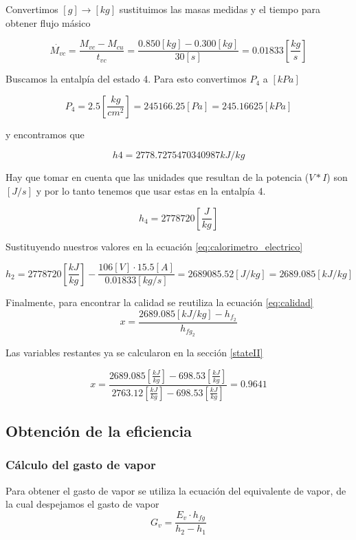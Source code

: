 \documentclass[12pt,letterpaper]{article}
\begin{document}
Convertimos $[g]\to[kg]$ sustituimos las masas medidas y el tiempo para obtener flujo másico

$$
    \dot{M_{vc}}=\frac{M_{vc}-M_{cu}}{t_{vc}}=\frac{0.850[kg]-0.300[kg]}{30[s]}=0.01833 \left[\frac{kg}{s}\right]
$$

Buscamos la entalpía del estado 4. Para esto convertimos $P_4$ a $[kPa]$

$$
    P_4 = 2.5\left[\frac{kg}{cm^2} \right] = 245166.25[Pa] = 245.16625[kPa]
$$

y encontramos que

$$
    h4 = 2778.7275470340987 kJ/kg
$$

Hay que tomar en cuenta que las unidades que resultan de la potencia ($V*I$) son $[J/s]$
y por lo tanto tenemos que usar estas en la entalpía 4.

$$
    h_4 = 2778720\left[\frac{J}{kg}\right]
$$

Sustituyendo nuestros valores en la ecuación \ref{eq:calorimetro_electrico}

$$
    h_2 = 2778720\left[\frac{kJ}{kg}\right] - \frac{106[V]\cdot 15.5[A]}{0.01833[kg/s]} = 2689085.52\left[J/kg\right] = 2689.085\left[kJ/kg\right]
$$

Finalmente, para encontrar la calidad se reutiliza la ecuación \ref{eq:calidad}
$$
    x = \frac{2689.085\left[kJ/kg\right] - h_{f_2}}{h_{fg_2}}
$$

Las variables restantes ya se calcularon en la sección \ref{stateII}

$$
    x = \frac{2689.085\left[\frac{kJ}{kg}\right] - 698.53\left[\frac{kJ}{kg}\right]}
                {2763.12\left[\frac{kJ}{kg}\right] - 698.53\left[\frac{kJ}{kg}\right]}
    = 0.9641
$$


\subsection{Obtención de la eficiencia}


\subsubsection{Cálculo del gasto de vapor} \label{gasto_vapor}

Para obtener el gasto de vapor se utiliza la ecuación del equivalente de vapor, 
de la cual despejamos el gasto de vapor
\begin{equation} \label{eq:gasto_vapor}
    G_v = \frac{E_v\cdot h_{fg}}{h_2 - h_1}
\end{equation}
\end{document}
